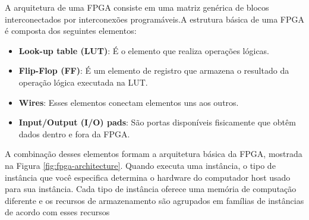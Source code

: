 A arquitetura de uma FPGA consiste em uma matriz genérica de blocos interconectados por interconexões programáveis.A estrutura básica de uma FPGA é composta dos seguintes elementos:
\begin{itemize}
    
    \item \textbf{Look-up table (LUT)}: É o elemento que realiza operações lógicas. 

    \item \textbf{Flip-Flop (FF)}:  É um elemento de registro que armazena o resultado da operação lógica executada na LUT. 

    \item \textbf{Wires}: Esses elementos conectam elementos uns aos outros.

    \item \textbf{Input/Output (I/O) pads}: São portas disponíveis fisicamente que obtêm dados dentro e fora da FPGA.
\end{itemize}

A combinação desses elementos formam a arquitetura básica da FPGA, mostrada na Figura \ref{fig:fpga-architecture}.
Quando executa uma instância, o tipo de instância que você especifica determina o hardware do computador host usado para sua instância. Cada tipo de instância oferece uma memória de computação diferente e os recursos de armazenamento são agrupados em famílias de instâncias de acordo com esses recursos

\begin{figure}[h!] 
   	    \captionsetup{width=12cm}%
	\end{figure}


